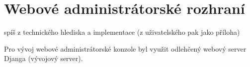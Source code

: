 
\section{Webové administrátorské rozhraní}
spíš z technického hlediska a implementace
(z uživatelského pak jako příloha)

Pro vývoj webové administrátorské konzole byl využit odlehčený webový server Djanga (vývojový server).

